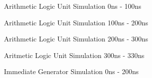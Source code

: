 \documentclass[
    a4paper, %
	12pt, %
    ]{CSSullivanBusinessReport}
\begin{document}
\begin{fullwidth}
\begin{figure}[H]
    \centering
    \captionsetup{style=widetable}
    \caption{Arithmetic Logic Unit Simulation 0ns - 100ns}
    \label{fig:ALUSim0}
\end{figure}

\begin{figure}[H]
    \centering
    \captionsetup{style=widetable}
    \caption{Arithmetic Logic Unit Simulation 100ns - 200ns}
    \label{fig:ALUSim1}
\end{figure}

\begin{figure}[H]
    \centering
    \captionsetup{style=widetable}
    \caption{Arithmetic Logic Unit Simulation 200ns - 300ns}
    \label{fig:ALUSim2}
\end{figure}

\begin{figure}[H]
    \centering
    \captionsetup{style=widetable}
    \caption{Aritmetic Logic Unit Simulation 300ns - 330ns}
    \label{fig:ALUSim3}
\end{figure}

\begin{figure}[H]
    \centering
    \captionsetup{style=widetable}
    \caption{Immediate Generator Simulation 0ns - 200ns}
    \label{fig:ImmdGenSim0}
\end{figure}


\end{fullwidth}
\end{document}
